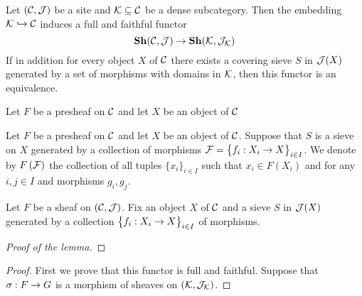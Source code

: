 \begin{theorem}\label{theorem:densesubcategoriesandsheaves}
Let $\left({\mathcal C},{\mathcal J}\right)$ be a site and ${\mathcal K}\subseteq {\mathcal C}$ be a dense subcategory. Then the embedding ${\mathcal K} \hookrightarrow {\mathcal C}$ induces a full and faithful functor
$$\mathbf{Sh}({\mathcal C},{\mathcal J})\rightarrow \mathbf{Sh}({\mathcal K},{\mathcal J}_{{\mathcal K}})$$
If in addition for every object $X$ of ${\mathcal C}$ there exists a covering sieve $S$ in ${\mathcal J}(X)$ generated by a set of morphisms with domains in ${\mathcal K}$, then this functor is an equivalence.
\end{theorem}
\noindent
Let $F$ be a presheaf on ${\mathcal C}$ and let $X$ be an object of ${\mathcal C}$
\begin{lemma}
Let $F$ be a presheaf on ${\mathcal C}$ and let $X$ be an object of ${\mathcal C}$. Suppose that $S$ is a sieve on $X$ generated by a collection of morphisms ${\mathcal F} = \big\{f_i:X_i\rightarrow X\big\}_{i\in I}$. We denote by $F\left({\mathcal F}\right)$ the collection of all tuples $\{x_i\}_{i\in I}$ such that $x_i\in F(X_i)$ and for any $i, j\in I$ and morphisms $g_i, g_j$.  
\end{lemma}

\begin{lemma}
Let $F$ be a sheaf on $({\mathcal C},{\mathcal J})$. Fix an object $X$ of ${\mathcal C}$ and a sieve $S$ in ${\mathcal J}(X)$ generated by a collection $\big\{f_i:X_i\rightarrow X\big\}_{i\in I}$ of morphisms.
\begin{center}
\end{center}
\end{lemma}
\begin{proof}[Proof of the lemma]

\end{proof}

\begin{proof}
First we prove that this functor is full and faithful. Suppose that $\sigma:F\rightarrow G$ is a morphism of sheaves on $\left({\mathcal K},{\mathcal J}_{{\mathcal K}}\right)$.
\end{proof}
























\small




